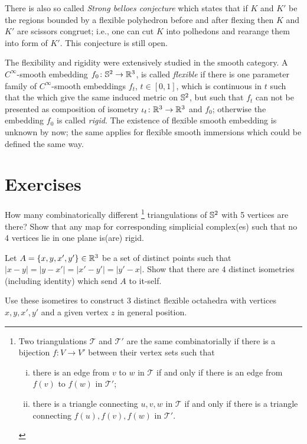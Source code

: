 There is also so called \emph{Strong belloes conjecture} which states that if $K$ and $K'$ be the regions bounded by a flexible polyhedron before and after flexing then $K$ and $K'$ are scissors congruet; i.e., one can cut $K$ into polhedons and rearange them into form of $K'$.
This conjecture is still open.

The flexibility and rigidity were extensively studied in the smooth category.
A $C^\infty$-smooth embedding $f_0\colon\mathbb{S}^2\to \mathbb{R}^3$,
is called \emph{flexible} if there is one parameter family of $C^\infty$-smooth embeddings $f_t$, $t\in[0,1]$,
which is continuous in $t$ such that the which give the same induced metric on $\mathbb{S}^2$,
but such that $f_t$ can not be presented as composition of isometry $\iota_t\colon\mathbb{R}^3\to \mathbb{R}^3$ and $f_0$;
otherwise the embedding $f_0$ is called \emph{rigid}.
The existence of flexible smooth embedding is unknown by now;
the same applies for  flexible smooth immersions which could be defined the same way.





\section*{Exercises}


\begin{pr}\label{pr:trig-S2}
How many combinatorically different%
\footnote{Two triangulations $\mathcal{T}$ and $\mathcal{T}'$ are the same combinatorially if there is a bijection $f: V \to V'$ between their vertex sets such that \begin{enumerate}[i)] \item there is an edge from $v$ to $w$ in $\mathcal{T}$ if and only if there is an edge from $f(v)$ to $f(w)$ in $\mathcal{T}'$; \item there is a triangle connecting $u,v,w$ in $\mathcal{T}$ if and only if there is a triangle connecting $f(u), f(v), f(w)$ in $\mathcal{T}'$. \end{enumerate}}
triangulations of $\mathbb{S}^2$ with 5 vertices are there?
Show that any map for corresponding simplicial complex(es) such that no 4 vertices lie in one plane is(are) rigid. 
\end{pr}

\begin{pr}\label{bricard-second}
Let $A=\{x,y,x',y'\}\in\mathbb{R}^3$ be a set of distinct points such that
$|x-y|=|y-x'|=|x'-y'|=|y'-x|$.
Show that there are $4$ distinct isometries (including identity)
which send $A$ to it-self.

Use these isometires to construct 3 distinct flexible octahedra with vertices $x,y,x',y'$
and a given vertex $z$ in general position. 
\end{pr}

